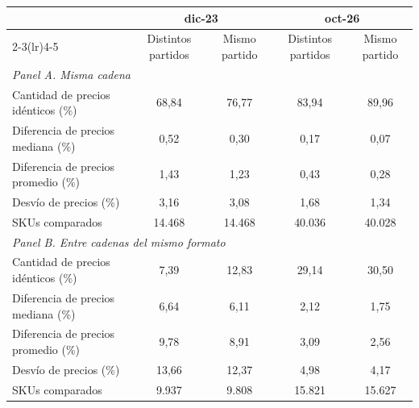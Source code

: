 \begin{tabular}{lcccc}
\toprule
 & \multicolumn{2}{c}{dic-23} & \multicolumn{2}{c}{oct-26} \\
\cmidrule(lr){2-3}\cmidrule(lr){4-5}
 & Distintos partidos & Mismo partido & Distintos partidos & Mismo partido \\
\midrule
\multicolumn{5}{l}{\textit{Panel A. Misma cadena}} \\
Cantidad de precios idénticos (\%) & 68,84 & 76,77 & 83,94 & 89,96 \\
Diferencia de precios mediana (\%) & 0,52 & 0,30 & 0,17 & 0,07 \\
Diferencia de precios promedio (\%) & 1,43 & 1,23 & 0,43 & 0,28 \\
Desvío de precios (\%) & 3,16 & 3,08 & 1,68 & 1,34 \\
SKUs comparados & 14.468 & 14.468 & 40.036 & 40.028 \\
\midrule
\multicolumn{5}{l}{\textit{Panel B. Entre cadenas del mismo formato}} \\
Cantidad de precios idénticos (\%) & 7,39 & 12,83 & 29,14 & 30,50 \\
Diferencia de precios mediana (\%) & 6,64 & 6,11 & 2,12 & 1,75 \\
Diferencia de precios promedio (\%) & 9,78 & 8,91 & 3,09 & 2,56 \\
Desvío de precios (\%) & 13,66 & 12,37 & 4,98 & 4,17 \\
SKUs comparados & 9.937 & 9.808 & 15.821 & 15.627 \\
\bottomrule
\end{tabular}
